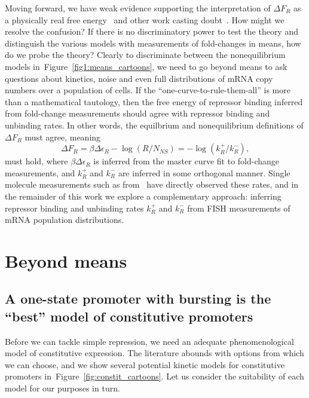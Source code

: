 \documentclass[12pt]{article}%
\newcommand{\fig}[1]{Figure~\ref{#1}}
\begin{document}
Moving forward, we have weak evidence supporting the
interpretation of $\Delta F_R$ as a physically real free
energy~\cite{Landman2019} and other work casting
doubt~\cite{Hammar2014}.
How might we resolve the confusion?
If there is no discriminatory power to test the theory and
distinguish the various models with measurements of fold-changes
in means, how do we probe the theory? Clearly to discriminate
between the nonequilibrium models in~\fig{fig1:means_cartoons},
we need to go beyond means to ask questions about kinetics, noise and even
full distributions of mRNA copy numbers over a population of cells.
If the ``one-curve-to-rule-them-all'' is more than a
mathematical tautology, then the free energy of repressor binding
inferred from fold-change measurements should agree with
repressor binding and unbinding rates.
In other words, the equilbrium and nonequilibrium definitions of
$\Delta F_R$ must agree, meaning
\begin{equation}
\Delta F_R = \beta\Delta\epsilon_R - \log(R/N_{NS})
        = - \log(k_R^+/k_R^-),
\end{equation}
must hold, where $\beta\Delta\epsilon_R$ is inferred from the
master curve fit to fold-change measurements, and $k_R^+$ and
$k_R^-$ are inferred in some orthogonal manner.
Single molecule measurements such as from~\cite{Hammar2014} have
directly observed these rates, and in the remainder of this work
we explore a complementary approach: inferring repressor binding
and unbinding rates $k_R^+$ and $k_R^-$ from FISH measurements of
mRNA population distributions.

\section{Beyond means}
\subsection{A one-state promoter with bursting is the ``best'' model of constitutive promoters}
Before we can tackle simple repression, we need an adequate
phenomenological model of constitutive expression.
The literature abounds with options from which we can choose,
and we show several potential kinetic models for constitutive promoters
in~\fig{fig:constit_cartoons}.
Let us consider the suitability of each model for our purposes in turn.
\end{document}
